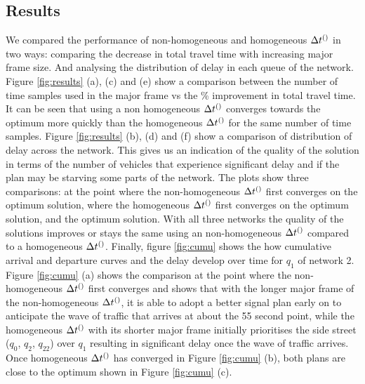 \subsection{Results}

We compared the performance of non-homogeneous and homogeneous $\DT[]$ in two ways: comparing the decrease in total travel time with increasing major frame size. And analysing the distribution of delay in each queue of the network. Figure \ref{fig:results} (a), (c) and (e) show a comparison between the number of time samples used in the major frame vs the \% improvement in total travel time. It can be seen that using a non homogeneous $\DT[]$ converges towards the optimum more quickly than the homogeneous $\DT[]$ for the same number of time samples. Figure \ref{fig:results} (b), (d) and (f) show a comparison of distribution of delay across the network. This gives us an indication of the quality of the solution in terms of the number of vehicles that experience significant delay and if the plan may be starving some parts of the network.  The plots show three comparisons: at the point where the non-homogeneous $\DT[]$ first converges on the optimum solution, where the homogeneous $\DT[]$ first converges on the optimum solution, and the optimum solution. With all three networks the quality of the solutions improves or stays the same using an non-homogeneous $\DT[]$ compared to a homogeneous $\DT[]$.
Finally, figure \ref{fig:cumu} shows the how cumulative arrival and departure curves and the delay develop over time for $q_1$ of network 2. Figure \ref{fig:cumu} (a) shows the comparison at the point where the non-homogeneous $\DT[]$ first converges and shows that with the longer major frame of the non-homogeneous $\DT[]$, it is able to adopt a better signal plan early on to anticipate the wave of traffic that arrives at about the 55 second point, while the homogeneous $\DT[]$ with its shorter major frame initially prioritises the side street ($q_0$, $q_2$, $q_{22}$) over $q_1$ resulting in significant delay once the wave of traffic arrives. Once homogeneous $\DT[]$ has converged in Figure \ref{fig:cumu} (b), both plans are close to the optimum shown in Figure \ref{fig:cumu} (c).

